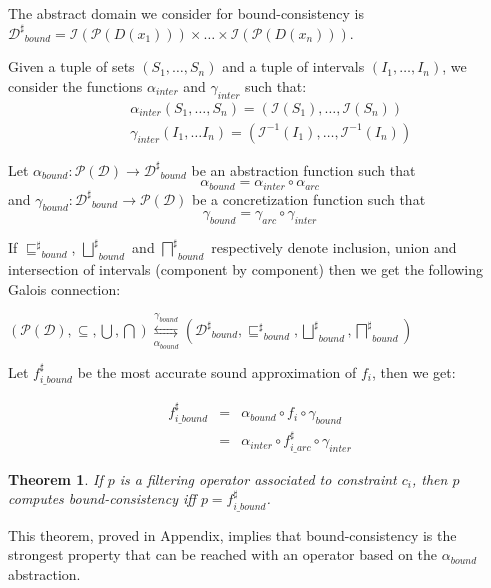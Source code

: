 \documentclass[submission,copyright,creativecommons]{eptcs}
\newtheorem{theorem}{Theorem}
\newcommand{\parties}[1]{\mathcal{P}(#1)}
\newcommand{\sh}[1]{\ensuremath{#1^\sharp}}
\begin{document}
\noindent
The abstract domain we consider for bound-consistency is 
$\sh{\mathcal{D}}_{bound} = \mathcal{I}(\mathcal{P}(D(x_1))) \times
\ldots \times \mathcal{I}(\mathcal{P}(D(x_n)))$.

\noindent
Given a tuple of sets $(S_1,\ldots,S_n)$ and a tuple of intervals
$(I_1, \ldots, I_n)$, we consider the functions 
$\alpha_{inter}$ and $\gamma_{inter}$ such that:
\begin{eqnarray*}
&&\alpha_{inter}(S_1,\ldots,S_n) = (\mathcal{I}(S_1), \ldots, \mathcal{I}(S_n)) \\
&&\gamma_{inter}(I_1, \ldots I_n) = (\mathcal{I}^{-1}(I_1), \ldots, \mathcal{I}^{-1}(I_n))
\end{eqnarray*}


\noindent
Let $\alpha_{bound} : \parties{\mathcal{D}} \rightarrow \sh{\mathcal{D}}_{bound}$ be an abstraction function such that 
$$ \alpha_{bound} = \alpha_{inter} \circ \alpha_{arc}$$
and $\gamma_{bound} : \sh{\mathcal{D}}_{bound} \rightarrow
\parties{\mathcal{D}}$ be a concretization function such that 
$$ \gamma_{bound} = \gamma_{arc} \circ \gamma_{inter}$$

\noindent
If $\sh{\sqsubseteq}_{bound}$, $\sh{\bigsqcup}_{bound}$ and
$\sh{\bigsqcap}_{bound}$ respectively denote inclusion, union and
intersection of intervals (component by component) then we get the following Galois connection:

\begin{center}
$
(\parties{\mathcal{D}}, \subseteq, \bigcup, \bigcap) \overset{\gamma_{bound}}{\underset{\alpha_{bound}}{\leftrightarrows}} 
(\sh{\mathcal{D}}_{bound}, \sh{\sqsubseteq}_{bound}, \sh{\bigsqcup}_{bound}, \sh{\bigsqcap}_{bound})
$
\end{center}

\noindent
Let $\sh{f_{i\_bound}}$ be the most accurate sound approximation of $f_i$, then we get:

\begin{eqnarray*}
\sh{f_{i\_bound}} &=& \alpha_{bound} \circ f_i \circ \gamma_{bound} \\
& =& \alpha_{inter} \circ \sh{f_{i\_arc}} \circ \gamma_{inter} 
\end{eqnarray*}

\begin{theorem}
 If $p$ is a filtering operator associated to constraint $c_i$, then  $p$ computes 
 bound-consistency iff $p = \sh{f_{i\_bound}}$. 
\end{theorem}

\noindent
This theorem, proved in Appendix, implies that bound-consistency is the strongest property that can be reached with an operator
based on the $\alpha_{bound}$ abstraction.
\end{document}
